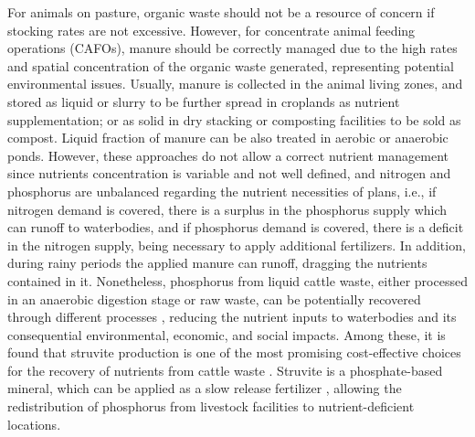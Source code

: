 \begin{refsection}[referencesCh3]
For animals on pasture, organic waste should not be a resource of concern if stocking rates are not excessive. However, for concentrate animal feeding operations (CAFOs), manure should be correctly managed due to the high rates and spatial concentration of the organic waste generated, representing potential environmental issues. Usually, manure is collected in the animal living zones, and stored as liquid or slurry to be further spread in croplands as nutrient supplementation; or as solid in dry stacking or composting facilities to be sold as compost. Liquid fraction of manure can be also treated in aerobic or anaerobic ponds. However, these approaches do not allow a correct nutrient management since nutrients concentration is variable and not well defined, and nitrogen and phosphorus are unbalanced regarding the nutrient necessities of plans, i.e., if nitrogen demand is covered, there is a surplus in the phosphorus supply which can runoff to waterbodies, and if phosphorus demand is covered, there is a deficit in the nitrogen supply, being necessary to apply additional fertilizers. In addition, during rainy periods the applied manure can runoff, dragging the nutrients contained in it. Nonetheless, phosphorus from liquid cattle waste, either processed in an anaerobic digestion stage or raw waste, can be potentially recovered through different processes \citep{muhmood2019formation}, reducing the nutrient inputs to waterbodies and its consequential environmental, economic, and social impacts. Among these, it is found that struvite production is one of the most promising cost-effective choices for the recovery of nutrients from cattle waste \citep{Martin}. Struvite is a phosphate-based mineral, which can be applied as a slow release fertilizer \citep{Richards}, allowing the redistribution of phosphorus from livestock facilities to nutrient-deficient locations.


\end{refsection}
